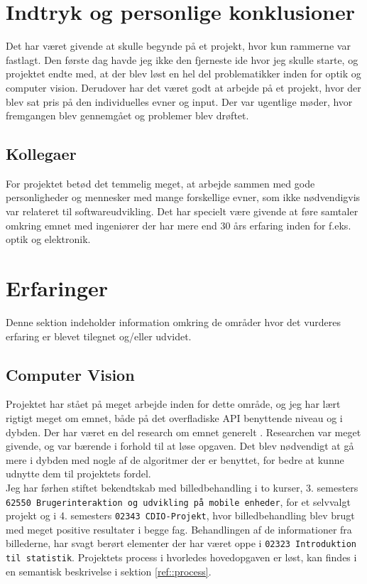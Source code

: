 \section{Indtryk og personlige konklusioner}

Det har været givende at skulle begynde på et projekt, hvor kun rammerne var fastlagt. Den første dag havde jeg ikke den fjerneste ide hvor jeg skulle starte, og projektet endte med, at der blev løst en hel del problematikker inden for optik og computer vision. Derudover har det været godt at arbejde på et projekt, hvor der blev sat pris på den individuelles evner og input.  Der var ugentlige møder, hvor fremgangen blev gennemgået og problemer blev drøftet. 

\subsection{Kollegaer}
For projektet betød det temmelig meget, at arbejde sammen med gode personligheder og mennesker med mange forskellige evner, som ikke nødvendigvis var relateret til softwareudvikling. Det har specielt være givende at føre samtaler omkring emnet med ingeniører der har mere end 30 års erfaring inden for f.eks. optik og elektronik.

\section{Erfaringer}
Denne sektion indeholder information omkring de områder hvor det vurderes erfaring er blevet tilegnet og/eller udvidet.

\subsection{Computer Vision}
Projektet har stået på meget arbejde inden for dette område, og jeg har lært rigtigt meget om emnet, både på det overfladiske API benyttende niveau og i dybden. Der har været en del research om emnet generelt . Researchen var meget givende, og var bærende i forhold til at løse opgaven.
Det blev nødvendigt at gå mere i dybden med nogle af de algoritmer der er benyttet, for bedre at kunne udnytte dem til projektets fordel.\\
Jeg har førhen stiftet bekendtskab med billedbehandling i to kurser, 3. semesters\\ \texttt{62550 Brugerinteraktion og udvikling på mobile enheder}, for et selvvalgt projekt og i 4. semesters \texttt{02343 CDIO-Projekt}, hvor billedbehandling blev brugt med meget positive resultater i begge fag.
Behandlingen af de informationer fra billederne, har svagt berørt elementer der har været oppe i \texttt{02323 Introduktion til statistik}.
Projektets process i hvorledes hovedopgaven er løst, kan findes i en semantisk beskrivelse i sektion \ref{ref::process}.

